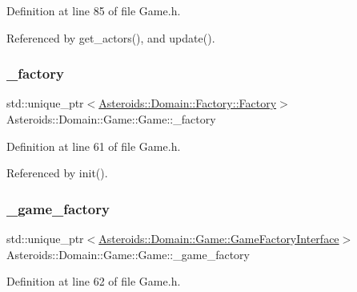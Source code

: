 Definition at line 85 of file Game.\+h.



Referenced by get\+\_\+actors(), and update().

\mbox{\label{classAsteroids_1_1Domain_1_1Game_1_1Game_a1085fddc231fc9b055b1c36d68a3eece}} 
\subsubsection{\texorpdfstring{\+\_\+factory}{\_factory}}
{\footnotesize\ttfamily std\+::unique\+\_\+ptr$<$\hyperlink{classAsteroids_1_1Domain_1_1Factory_1_1Factory}{Asteroids\+::\+Domain\+::\+Factory\+::\+Factory}$>$ Asteroids\+::\+Domain\+::\+Game\+::\+Game\+::\+\_\+factory\hspace{0.3cm}{\ttfamily [private]}}



Definition at line 61 of file Game.\+h.



Referenced by init().

\mbox{\label{classAsteroids_1_1Domain_1_1Game_1_1Game_ae88a905921e87ce11e14fcbde3aa675a}} 
\subsubsection{\texorpdfstring{\+\_\+game\+\_\+factory}{\_game\_factory}}
{\footnotesize\ttfamily std\+::unique\+\_\+ptr$<$\hyperlink{classAsteroids_1_1Domain_1_1Game_1_1GameFactoryInterface}{Asteroids\+::\+Domain\+::\+Game\+::\+Game\+Factory\+Interface}$>$ Asteroids\+::\+Domain\+::\+Game\+::\+Game\+::\+\_\+game\+\_\+factory\hspace{0.3cm}{\ttfamily [private]}}



Definition at line 62 of file Game.\+h.



